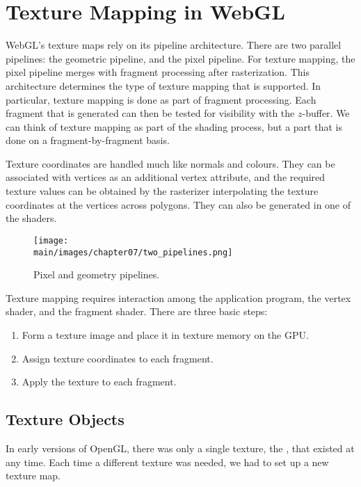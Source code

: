 \documentclass[../COS3712_Notes.tex]{subfiles}
\begin{document}
    \section{Texture Mapping in WebGL}
      WebGL's texture maps rely on its pipeline architecture.
      There are two parallel pipelines: the geometric pipeline, and the pixel pipeline.
      For texture mapping, the pixel pipeline merges with fragment processing after rasterization.
      This architecture determines the type of texture mapping that is supported.
      In particular, texture mapping is done as part of fragment processing.
      Each fragment that is generated can then be tested for visibility with the $z$-buffer.
      We can think of texture mapping as part of the shading process, but a part that is done
      on a fragment-by-fragment basis.

      Texture coordinates are handled much like normals and colours.
      They can be associated with vertices as an additional vertex attribute,
      and the required texture values can be obtained by the rasterizer interpolating
      the texture coordinates at the vertices across polygons.
      They can also be generated in one of the shaders.

      \begin{figure}
        \begin{center}
          \texttt{[image: \\main/images/chapter07/two\_pipelines.png]}
        \end{center}
        \caption{Pixel and geometry pipelines.}
      \end{figure}

      Texture mapping requires interaction among the application program, the vertex shader,
      and the fragment shader.
      There are three basic steps:
      \begin{enumerate}
        \item Form a texture image and place it in texture memory on the GPU.
        \item Assign texture coordinates to each fragment.
        \item Apply the texture to each fragment.
      \end{enumerate}

      \subsection{Texture Objects}
        In early versions of OpenGL, there was only a single texture,
        the , that existed at any time.
        Each time a different texture was needed, we had to set up a new texture map.
\end{document}
